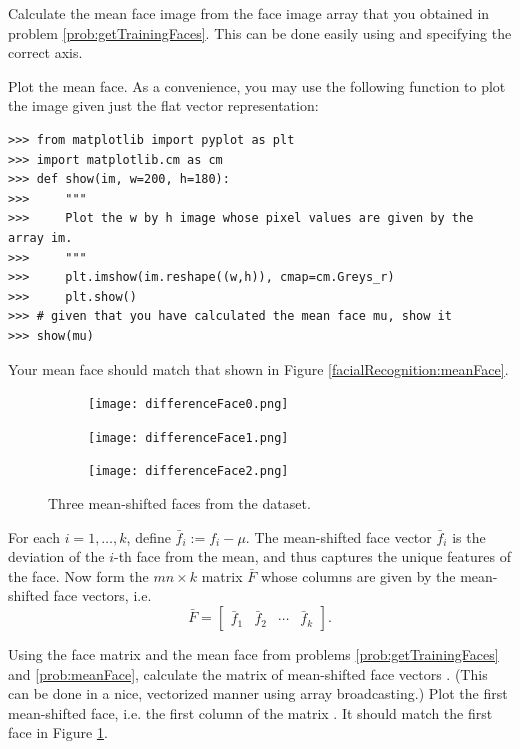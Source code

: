 \begin{problem}
\label{prob:meanFace}
Calculate the mean face image  from the face image array  that you obtained in problem \ref{prob:getTrainingFaces}.
This can be done easily using  and specifying the correct axis.

Plot the mean face.
As a convenience, you may use the following function to plot the image given just the flat vector representation:
\begin{lstlisting}
>>> from matplotlib import pyplot as plt
>>> import matplotlib.cm as cm
>>> def show(im, w=200, h=180):
>>>     """
>>>     Plot the w by h image whose pixel values are given by the array im.
>>>     """
>>>     plt.imshow(im.reshape((w,h)), cmap=cm.Greys_r)
>>>     plt.show()
>>> # given that you have calculated the mean face mu, show it
>>> show(mu)
\end{lstlisting}
Your mean face should match that shown in Figure \ref{facialRecognition:meanFace}.
\end{problem}
\begin{figure}
\begin{subfigure}[b]{0.3\textwidth}
\texttt{[image: differenceFace0.png]}
\end{subfigure}
\begin{subfigure}[b]{0.3\textwidth}
\texttt{[image: differenceFace1.png]}
\end{subfigure}
\begin{subfigure}[b]{0.3\textwidth}
\texttt{[image: differenceFace2.png]}
\end{subfigure}
\caption{Three mean-shifted faces from the dataset.}
\label{facialRecognition:differenceFaces}
\end{figure}
For each $i = 1,\ldots, k$, define $\bar{f}_i := f_i - \mu$.
The mean-shifted face vector $\bar{f}_i$ is the deviation of the $i$-th face from the mean, and thus captures the unique features of the face.
Now form the $mn \times k$ matrix $\bar{F}$ whose columns are given by the mean-shifted face vectors, i.e.
\[
\bar{F} = \begin{bmatrix}
\bar{f}_1 & \bar{f}_2 & \cdots & \bar{f}_k
\end{bmatrix}.
\]
\begin{problem}
Using the face matrix  and the mean face  from problems \ref{prob:getTrainingFaces} and \ref{prob:meanFace}, calculate the
matrix of mean-shifted face vectors .
(This can be done in a nice, vectorized manner using array broadcasting.)
Plot the first mean-shifted face, i.e. the first column of the matrix .
It should match the first face in Figure \ref{facialRecognition:differenceFaces}.
\end{problem}

